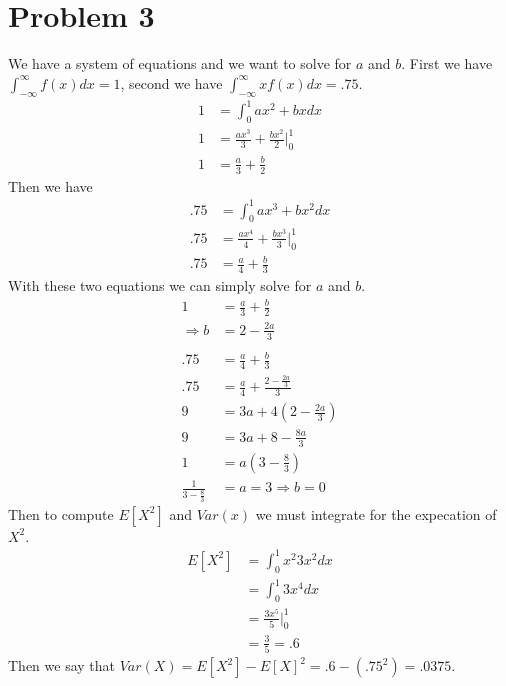 \documentclass{article}
\begin{document}
\section*{Problem 3}
    We have a system of equations and we want to solve for $a$ and $b$.
    First we have $\int_{-\infty}^\infty f(x) dx = 1$, second we have $\int_{-\infty}^\infty x f(x) dx = .75$.
    \begin{align*}
        1 &= \int_0^1 ax^2 + bx dx \\
        1&= \frac{ax^3}{3} + \frac{bx^2}{2}\bigg|_0^1\\
        1&= \frac{a}{3} + \frac{b}{2}
    \end{align*}
    Then we have
    \begin{align*}
        .75 &= \int_0^1 a x^3 + bx^2 dx\\
        .75&= \frac{a x^4}{4} + \frac{b x^3}{3} \bigg|_0^1 \\
        .75&= \frac{a}{4} + \frac{b}{3}
    \end{align*}
    With these two equations we can simply solve for $a$ and $b$.
    \begin{align*}
        1&= \frac{a}{3} + \frac{b}{2}\\
        \Longrightarrow b &= 2 - \frac{2a}{3}\\\\
        .75 &= \frac{a}{4} + \frac{b}{3}\\
        .75 &= \frac{a}{4} + \frac{2 - \frac{2a}{3}}{3}\\
        9 &= 3a + 4(2 - \frac{2a}{3})\\
        9 &= 3a + 8 - \frac{8a}{3}\\
        1 &= a(3 -\frac{8}{3})\\
        \frac{1}{3- \frac{8}{3}} &= a = 3 \Rightarrow b = 0
    \end{align*}
    Then to compute $E[X^2]$ and $Var(x)$ we must integrate for the expecation of $X^2$.
    \begin{align*}
        E[X^2] &= \int_0^1 x^2 3x^2 dx\\
        &= \int_0^1 3x^4 dx \\
        &= \frac{3x^5}{5} \bigg|_0^1\\
        &= \frac{3}{5} = .6
    \end{align*}
    Then we say that $Var(X) = E[X^2] - E[X]^2 = .6 - (.75^2) = .0375$.
\end{document}
